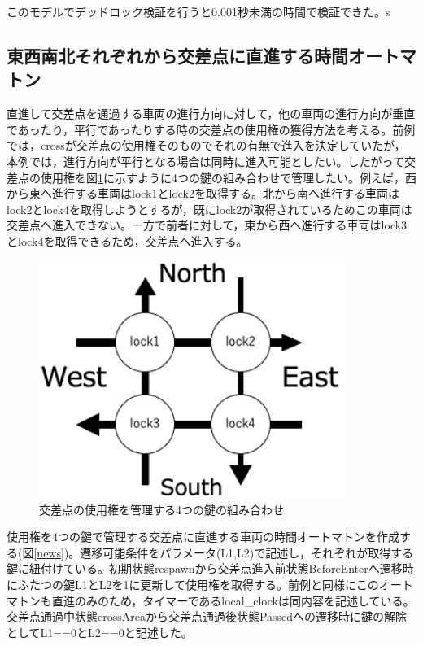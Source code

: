 \documentclass{tpu-sotu}
\begin{document}
	このモデルでデッドロック検証を行うと0.001秒未満の時間で検証できた。s

	
	\subsection{東西南北それぞれから交差点に直進する時間オートマトン}
	直進して交差点を通過する車両の進行方向に対して，他の車両の進行方向が垂直であったり，平行であったりする時の交差点の使用権の獲得方法を考える。前例では，crossが交差点の使用権そのものでそれの有無で進入を決定していたが，本例では，進行方向が平行となる場合は同時に進入可能としたい。したがって交差点の使用権を図\ref{oTWoL}に示すように4つの鍵の組み合わせで管理したい。例えば，西から東へ進行する車両はlock1とlock2を取得する。北から南へ進行する車両はlock2とlock4を取得しようとするが，既にlock2が取得されているためこの車両は交差点へ進入できない。一方で前者に対して，東から西へ進行する車両はlock3とlock4を取得できるため，交差点へ進入する。
	\begin{figure}[htbp]
	\centering
	\includegraphics[width=100mm]{onTheWayofLock.png}
	\caption{交差点の使用権を管理する4つの鍵の組み合わせ}
	\label{oTWoL}
	\end{figure}
	
	使用権を4つの鍵で管理する交差点に直進する車両の時間オートマトンを作成する(図\ref{news})。遷移可能条件をパラメータ(L1,L2)で記述し，それぞれが取得する鍵に紐付けている。初期状態respawnから交差点進入前状態BeforeEnterへ遷移時にふたつの鍵L1とL2を1に更新して使用権を取得する。前例と同様にこのオートマトンも直進のみのため，タイマーであるlocal\_clockは同内容を記述している。交差点通過中状態crossAreaから交差点通過後状態Passedへの遷移時に鍵の解除としてL1==0とL2==0と記述した。
	
\end{document}
